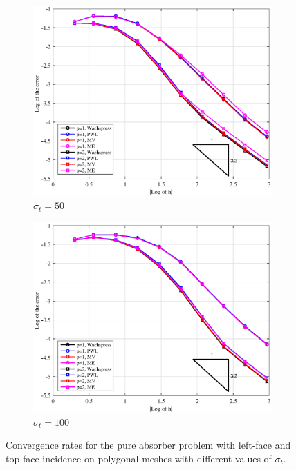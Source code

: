 \begin{figure}
{}
\vspace{1cm}
{
	\begin{subfigure}[b]{0.485\textwidth}
		\centering
		\label{subfig::PA_LeftTop_Poly_sig50}
		\includegraphics[width=\textwidth]{figures/sec_BF/PAErr_LeftTop_Poly_sig50.eps}
	\caption{$\sigma_t = 50$}
	\end{subfigure}
	\hfill
	\begin{subfigure}[b]{0.485\textwidth}
		\centering
		\label{subfig::PA_LeftTop_Poly_sig100}
		\includegraphics[width=\textwidth]{figures/sec_BF/PAErr_LeftTop_Poly_sig100.eps}
	\caption{$\sigma_t = 100$}
	\end{subfigure}
}
\caption{Convergence rates for the pure absorber problem with left-face and top-face incidence on polygonal meshes with different values of $\sigma_t$.}
\label{fig::BF_Results_PA_LeftTop_Poly}
\end{figure}

